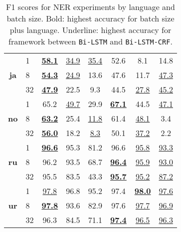 \begin{table}[h!]
\begin{tabular}{c l c c c|c c c}
        \cmidrule(lr){1-8}
        \multirow{3}{*}{\bfseries ja}
        &  1 &
        \underline{\textbf{58.1}} & \underline{34.9} & \underline{35.4} &
        52.6 &  8.1 & 14.8 \\
        &  8 &
        \underline{\textbf{54.3}} & \underline{24.9} & 13.6 &
        47.6 & 11.7 & \underline{47.3} \\
        & 32 &
        \underline{\textbf{47.9}} & 22.5 &  9.3 &
        44.5 & \underline{27.8} & \underline{45.2} \\

        \cmidrule(lr){1-8}
        \multirow{3}{*}{\bfseries no}
        &  1 &
        65.2 & \underline{49.7} & 29.9 &
        \underline{\textbf{67.1}} & 44.5 & \underline{47.1} \\
        &  8 &
        \underline{\textbf{63.2}} & 25.4 & \underline{11.8} &
        61.4 & \underline{48.1} &  3.4 \\
        & 32 &
        \underline{\textbf{56.0}} & 18.2 &  \underline{8.3 }&
        50.1 & \underline{37.2} &  2.2 \\

        \cmidrule(lr){1-8}
        \multirow{3}{*}{\bfseries ru}
        &  1 &
        \underline{\textbf{96.6}} & 95.3 & 81.2 &
        96.6 & \underline{95.8} & \underline{93.3} \\
        &  8 &
        96.2 & 93.5 & 68.7 &
        \underline{\textbf{96.4}} & \underline{95.9} & \underline{93.0} \\
        & 32 &
        95.5 & 83.5 & 43.3 &
        \underline{\textbf{95.7}} & \underline{95.2} & \underline{87.2} \\

        \cmidrule(lr){1-8}
        \multirow{3}{*}{\bfseries ur}
        &  1 &
        \underline{97.8} & 96.8 & 95.2 &
        97.4 & \underline{\textbf{98.0}} & \underline{97.6} \\
        &  8 &
        \underline{\textbf{97.8}} & 93.6 & 82.9 &
        97.6 & \underline{97.7} & \underline{96.9} \\
        & 32 &
        96.3 & 84.5 & 71.1 &
        \underline{\textbf{97.4}} & \underline{96.5} & \underline{96.3} \\
        \bottomrule
    \end{tabular}
    \caption{F1 scores for NER experiments by language and batch
        size. Bold: highest accuracy for batch size plus language. Underline:
        highest accuracy for framework between \texttt{Bi-LSTM} and
        \texttt{Bi-LSTM-CRF}.
    }\label{table:f1-total-ner}
\end{table}


